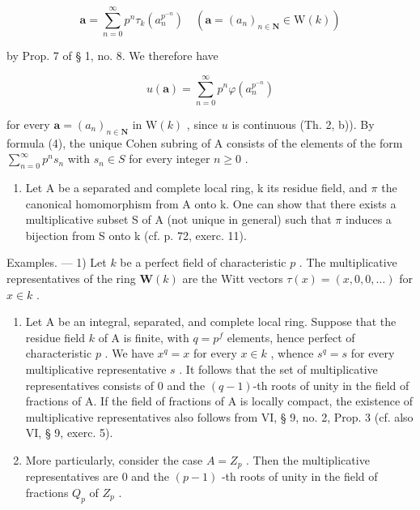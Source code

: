 \[
\boldsymbol {a} = \sum_ {n = 0} ^ {\infty} p ^ {n} \tau_ {k} (a _ {n} ^ {p ^ {- n}}) \quad (\boldsymbol {a} = (a _ {n}) _ {n \in \mathbf {N}} \in \mathrm{W} (k))
\]

by Prop. 7 of § 1, no. 8. We therefore have

\[
u (\boldsymbol {a}) = \sum_ {n = 0} ^ {\infty} p ^ {n} \varphi (a _ {n} ^ {p ^ {- n}})\tag{4}
\]

for every \(\boldsymbol{a} = (a_n)_{n \in \mathbf{N}}\) in \(\mathrm{W}(k)\) , since \(u\) is continuous (Th. 2, b)). By formula (4), the unique Cohen subring of A consists of the elements of the form \(\sum_{n=0}^{\infty} p^n s_n\) with \(s_n \in S\) for every integer \(n \geqslant 0\) .

\begin{enumerate}
\def\labelenumi{\arabic{enumi})}
\setcounter{enumi}{1}
\tightlist
\item
  Let A be a separated and complete local ring, k its residue field, and \(\pi\) the canonical homomorphism from A onto k. One can show that there exists a multiplicative subset S of A (not unique in general) such that \(\pi\) induces a bijection from S onto k (cf. p. 72, exerc. 11).
\end{enumerate}

Examples. --- 1) Let \(k\) be a perfect field of characteristic \(p\) . The multiplicative representatives of the ring \(\mathbf{W}(k)\) are the Witt vectors \(\tau(x) = (x, 0, 0, \ldots)\) for \(x \in k\) .

\begin{enumerate}
\def\labelenumi{\arabic{enumi})}
\setcounter{enumi}{1}
\item
  Let A be an integral, separated, and complete local ring. Suppose that the residue field \(k\) of A is finite, with \(q = p^{f}\) elements, hence perfect of characteristic \(p\) . We have \(x^{q} = x\) for every \(x \in k\) , whence \(s^{q} = s\) for every multiplicative representative \(s\) . It follows that the set of multiplicative representatives consists of 0 and the \((q - 1)\)-th roots of unity in the field of fractions of A. If the field of fractions of A is locally compact, the existence of multiplicative representatives also follows from VI, § 9, no. 2, Prop. 3 (cf. also VI, § 9, exerc. 5).
\item
  More particularly, consider the case \(A = Z_{p}\) . Then the multiplicative representatives are 0 and the \((p - 1)\) -th roots of unity in the field of fractions \(Q_{p}\) of \(Z_{p}\) .
\end{enumerate}

